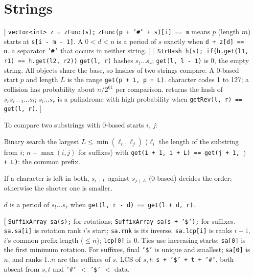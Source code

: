 \section{Strings}
\twolevels
{}

[
	 \texttt{vector<int> z = zFunc(s);}
	 \texttt{zFunc(p + '\#' + s)[i] == m} means $p$ (length $m$) starts at \texttt{s[i - m - 1]}.
	A $0 < d < n$ is a period of $s$ exactly when \texttt{d + z[d] == n}.
	 a separator \texttt{'\#'} that occurs in neither string.
]\label{zfunc}
[
	 \texttt{StrHash h(s); if(h.get(l1, r1) == h.get(l2, r2))}
	 \texttt{get(l, r)} hashes $s_l \dots s_r$; \texttt{get(l, l - 1)} is 0, the empty string.
	All objects share the base, so hashes of two strings compare.
	A 0-based start $p$ and length $L$ is the range \texttt{get(p + 1, p + L)}.
	 character codes 1 to 127; a collision has probability about $n / 2^{61}$ per comparison.
	 returns the hash of $s_r s_{r-1} \dots s_l$; $s_l \dots s_r$ is a palindrome with high probability when \texttt{getRev(l, r) == get(l, r)}.
]\label{strhash}
{\footnotesize\tightdisplay
{}
To compare two substrings with 0-based starts $i$, $j$:
\begin{facts}
	\item Binary search the largest $L \le \min(\ell_i, \ell_j)$ ($\ell_i$ the length of the substring from $i$; $n - \max(i, j)$ for suffixes) with \texttt{get(i + 1, i + L) == get(j + 1, j + L)}: the common prefix.
	\item If a character is left in both, $s_{i+L}$ against $s_{j+L}$ (0-based) decides the order; otherwise the shorter one is smaller.
	\item $d$ is a period of $s_l \dots s_r$ when \texttt{get(l, r - d) == get(l + d, r)}.
\end{facts}
}
[
	 \texttt{SuffixArray sa(s);} for rotations; \texttt{SuffixArray sa(s + '\$');} for suffixes.
	 \texttt{sa.sa[i]} is rotation rank $i$'s start; \texttt{sa.rnk} is its inverse.
	\texttt{sa.lcp[i]} is ranks $i-1$, $i$'s common prefix length ($\le n$); \texttt{lcp[0]} is 0.
	Ties use increasing starts; \texttt{sa[0]} is the first minimum rotation.
	 For suffixes, final \texttt{'\$'} is unique and smallest; \texttt{sa[0]} is $n$, and ranks $1..n$ are the suffixes of $s$.
	LCS of $s, t$: \texttt{s + '\$' + t + '\#'}, both absent from $s, t$ and \texttt{'\#'} $<$ \texttt{'\$'} $<$ data.
